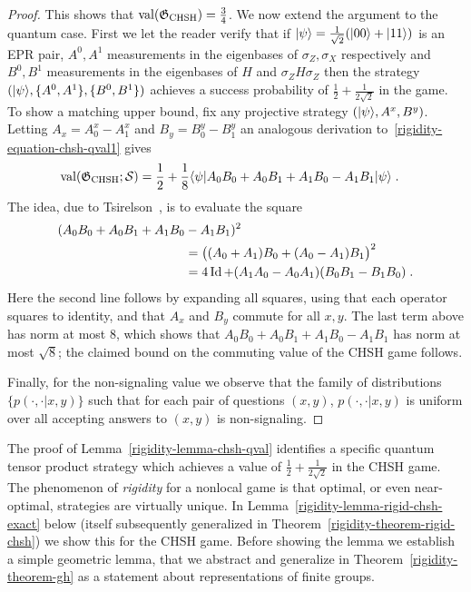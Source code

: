 \begin{proof}
This shows that $\mathrm{val}(\mathfrak{G}_{\mathrm{CHSH}})=\frac{3}{4}$. We now extend the argument to the quantum case. First we let the reader verify that if $|\psi\rangle = \frac{1}{\sqrt{2}} (|00\rangle + |11\rangle)$ is an EPR pair, $A^0, A^1$ measurements in the eigenbases of $\sigma_Z,\sigma_X$ respectively and $B^0,B^1$ measurements in the eigenbases of $H$ and $\sigma_Z H \sigma_Z$ then the strategy $(|\psi\rangle,\{A^0,A^1\},\{B^0,B^1\})$ achieves a success probability of $\frac{1}{2}+\frac{1}{2\sqrt{2}}$ in the game. To show a matching upper bound, fix any projective strategy $(|\psi\rangle, A^x,B^y)$. Letting $A_x = A^x_0-A^x_1$ and  $B_y = B^y_0-B^y_1$ an analogous derivation to~\eqref{rigidity-equation-chsh-qval1} gives 
\begin{align*}
\mathrm{val}(\mathfrak{G}_{\mathrm{CHSH}};\mathcal{S}) &=\frac{1}{2} + \frac{1}{8}\langle\psi| A_0 B_0 + A_0 B_1 + A_1 B_0 - A_1 B_1 |\psi\rangle\;.
\end{align*}
The idea, due to Tsirelson~\cite{cirel1980quantum}, is to evaluate the square
\begin{align}
(A_0 B_0 + A_0 B_1 + A_1 B_0 &- A_1 B_1 )^2\label{equation-bellop}\\
 &=\big( (A_0+A_1) B_0 + (A_0-A_1) B_1 \big)^2\notag\\
&= 4\mathop{\rm Id}\nolimits + (A_1A_0-A_0A_1) (B_0B_1-B_1B_0)\;.\notag
\end{align}
Here the second line follows by expanding all squares, using that each operator squares to identity, and that $A_x$ and $B_y$ commute for all $x,y$. The last term above has norm at most $8$, which shows that $A_0 B_0 + A_0 B_1 + A_1 B_0 - A_1 B_1 $ has norm at most $\sqrt{8}$; the claimed bound on the commuting value of the CHSH game  follows. 

Finally, for the non-signaling value we observe that the family of distributions $\{p(\cdot,\cdot|x,y)\}$ such that for each pair of questions $(x,y)$, $p(\cdot,\cdot|x,y)$ is uniform over all accepting answers to $(x,y)$ is non-signaling. 
\end{proof}


The proof of Lemma~\ref{rigidity-lemma-chsh-qval} identifies a specific quantum tensor product strategy which achieves a value of $\frac{1}{2} + \frac{1}{2\sqrt{2}}$ in the CHSH game. The phenomenon of \emph{rigidity} for a nonlocal game is that optimal, or even near-optimal, strategies are virtually unique. In Lemma~\ref{rigidity-lemma-rigid-chsh-exact} below (itself subsequently generalized in Theorem~\ref{rigidity-theorem-rigid-chsh}) we show this for the CHSH game. Before showing the lemma we establish a simple geometric lemma, that we abstract and generalize  in Theorem~\ref{rigidity-theorem-gh} as a statement about representations of finite groups. 

